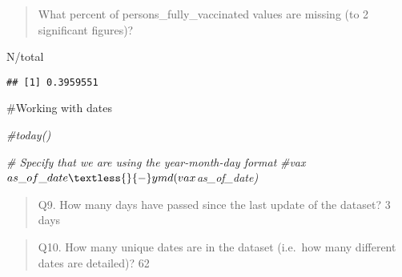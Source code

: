 \documentclass[
]{article}
\newenvironment{Shaded}{\begin{snugshade}}{\end{snugshade}}
\newcommand{\CommentTok}[1]{\textcolor[rgb]{0.56,0.35,0.01}{\textit{#1}}}
\newcommand{\FunctionTok}[1]{\textcolor[rgb]{0.00,0.00,0.00}{#1}}
\newcommand{\NormalTok}[1]{#1}
\newcommand{\OtherTok}[1]{\textcolor[rgb]{0.56,0.35,0.01}{#1}}
\newcommand{\SpecialCharTok}[1]{\textcolor[rgb]{0.00,0.00,0.00}{#1}}
\begin{document}
\begin{quote}
What percent of persons\_fully\_vaccinated values are missing (to 2
significant figures)?
\end{quote}

\begin{Shaded}
\begin{Highlighting}[]
\NormalTok{N}\SpecialCharTok{/}\NormalTok{total}
\end{Highlighting}
\end{Shaded}

\begin{verbatim}
## [1] 0.3959551
\end{verbatim}

\#Working with dates

\begin{Shaded}
\begin{Highlighting}[]
\CommentTok{\#today()}

\CommentTok{\# Specify that we are using the year{-}month{-}day format}
\CommentTok{\#vax$as\_of\_date \textless{}{-} ymd(vax$as\_of\_date)}
\end{Highlighting}
\end{Shaded}

\begin{Shaded}
\end{Shaded}

\begin{quote}
Q9. How many days have passed since the last update of the dataset? 3
days
\end{quote}

\begin{Shaded}
\end{Shaded}

\begin{quote}
Q10. How many unique dates are in the dataset (i.e.~how many different
dates are detailed)? 62
\end{quote}

\begin{Shaded}
\end{Shaded}
\end{document}
